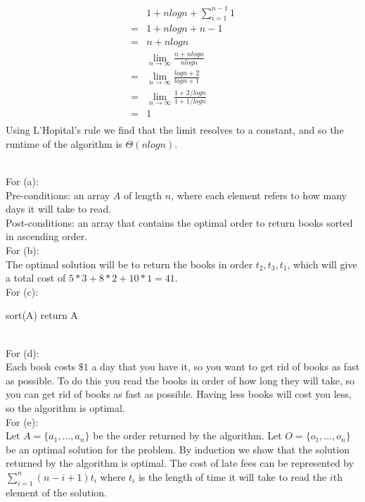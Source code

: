 \documentclass{assignment}
\begin{document}
\begin{problemlist}
\begin{answer}
\begin{align*}
&1 + nlogn + \sum_{i=1}^{n-1} 1\\
=&1 + nlogn + n-1\\
=&n + nlogn\\
&\lim_{n\rightarrow \infty} \frac{n + nlogn}{nlogn}\\
=&\lim_{n\rightarrow \infty} \frac{logn + 2}{logn + 1}\\
=&\lim_{n\rightarrow \infty} \frac{1 + 2/logn}{1 + 1/logn}\\
=&1\\
\end{align*}
Using L'Hopital's rule we find that the limit resolves to a constant, and so the runtime of the algorithm is $\Theta (nlogn)$.\\
\end{answer}
\clearpage
\pbitem
\begin{problem}
\end{problem}
\begin{answer}
\\
For (a):\\
Pre-conditions: an array $A$ of length $n$, where each element refers to how many days it will take to read.\\
Post-conditions: an array that contains the optimal order to return books sorted in ascending order.\\
For (b):\\
The optimal solution will be to return the books in order $t_2,t_3,t_1$, which will give a total cost of $5*3+8*2+10*1=41$.\\
For (c):\\
\begin{algorithm}
  sort(A)\;
  return A\;
\end{algorithm}
\\For (d):\\
Each book costs $\$1$ a day that you have it, so you want to get rid of books as fast as possible. To do this you read the books in order of how long they will take, so you can get rid of books as fast as possible. Having less books will cost you less, so the algorithm is optimal.\\
For (e):\\
Let $A=\{a_1,\ldots,a_n\}$ be the order returned by the algorithm. Let $O=\{o_1,\ldots,o_n\}$ be an optimal solution for the problem. By induction we show that the solution returned by the algorithm is optimal. The cost of late fees can be represented by $\sum_{i=1}^{n} (n-i+1)t_i$ where $t_i$ is the length of time it will take to read the $i$th element of the solution.

\end{answer}
\end{problemlist}
\end{document}
